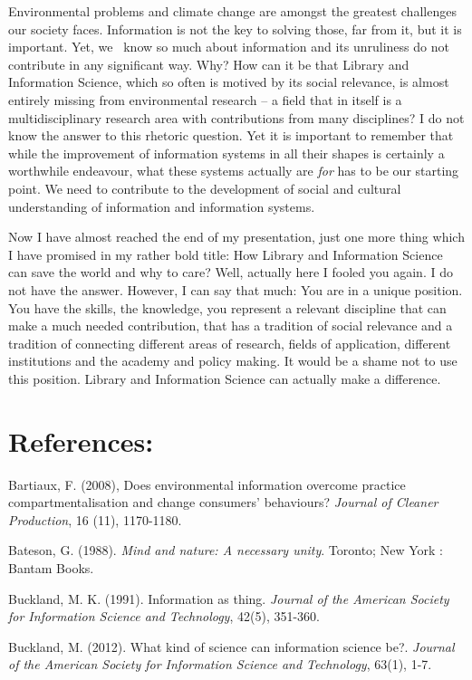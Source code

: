 \documentclass[a4paper,
fontsize=11pt,
oneside,
numbers=noperiodatend,
parskip=half-,
bibliography=totoc,
final
]{scrartcl}
\begin{document}
Environmental problems and climate change are amongst the greatest
challenges our society faces. Information is not the key to solving
those, far from it, but it is important. Yet, we~ know so much about
information and its unruliness do not contribute in any significant way.
Why? How can it be that Library and Information Science, which so often
is motived by its social relevance, is almost entirely missing from
environmental research -- a field that in itself is a multidisciplinary
research area with contributions from many disciplines? I do not know
the answer to this rhetoric question. Yet it is important to remember
that while the improvement of information systems in all their shapes is
certainly a worthwhile endeavour, what these systems actually are
\emph{for} has to be our starting point. We need to contribute to the
development of social and cultural understanding of information and
information systems.

Now I have almost reached the end of my presentation, just one more
thing which I have promised in my rather bold title: How Library and
Information Science can save the world and why to care? Well, actually
here I fooled you again. I do not have the answer. However, I can say
that much: You are in a unique position. You have the skills, the
knowledge, you represent a relevant discipline that can make a much
needed contribution, that has a tradition of social relevance and a
tradition of connecting different areas of research, fields of
application, different institutions and the academy and policy making.
It would be a shame not to use this position. Library and Information
Science can actually make a difference.

\section*{References:~}\label{references}

Bartiaux, F. (2008), Does environmental information overcome practice
compartmentalisation and change consumers' behaviours? \emph{Journal of
Cleaner Production}, 16 (11), 1170-1180.

Bateson, G. (1988). \emph{Mind and nature: A necessary unity}. Toronto;
New York : Bantam Books.

Buckland, M. K. (1991). Information as thing. \emph{Journal of the
American Society for Information Science and Technology}, 42(5),
351-360.

Buckland, M. (2012). What kind of science can information science be?.
\emph{Journal of the American Society for Information Science and
Technology}, 63(1), 1-7.
\end{document}
